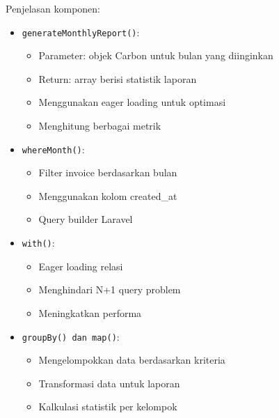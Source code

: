 \documentclass[a4paper]{report}
\begin{document}
Penjelasan komponen:
\begin{itemize}
\item \texttt{generateMonthlyReport()}:
    \begin{itemize}
    \item Parameter: objek Carbon untuk bulan yang diinginkan
    \item Return: array berisi statistik laporan
    \item Menggunakan eager loading untuk optimasi
    \item Menghitung berbagai metrik
    \end{itemize}

\item \texttt{whereMonth()}:
    \begin{itemize}
    \item Filter invoice berdasarkan bulan
    \item Menggunakan kolom created\_at
    \item Query builder Laravel
    \end{itemize}

\item \texttt{with()}:
    \begin{itemize}
    \item Eager loading relasi
    \item Menghindari N+1 query problem
    \item Meningkatkan performa
    \end{itemize}

\item \texttt{groupBy() dan map()}:
    \begin{itemize}
    \item Mengelompokkan data berdasarkan kriteria
    \item Transformasi data untuk laporan
    \item Kalkulasi statistik per kelompok
    \end{itemize}
\end{itemize}
\end{document}
